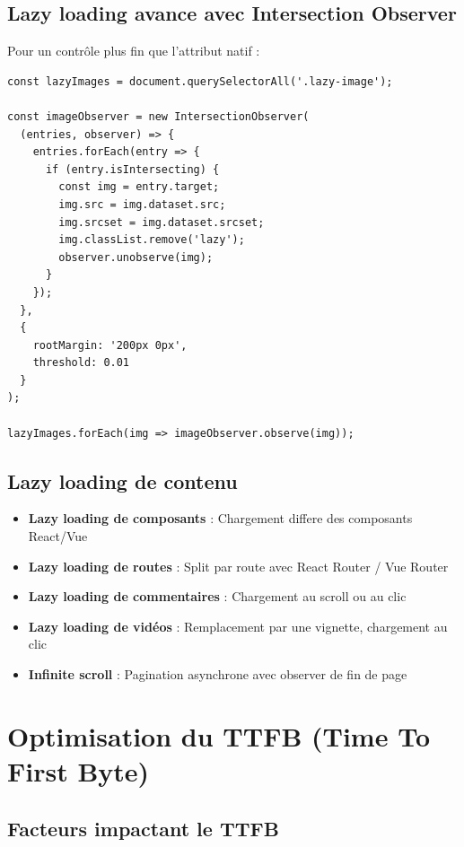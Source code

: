 \subsection{Lazy loading avance avec Intersection Observer}

Pour un contrôle plus fin que l'attribut natif :

\begin{lstlisting}[style=code,caption={Lazy loading avec Intersection Observer}]
const lazyImages = document.querySelectorAll('.lazy-image');

const imageObserver = new IntersectionObserver(
  (entries, observer) => {
    entries.forEach(entry => {
      if (entry.isIntersecting) {
        const img = entry.target;
        img.src = img.dataset.src;
        img.srcset = img.dataset.srcset;
        img.classList.remove('lazy');
        observer.unobserve(img);
      }
    });
  },
  {
    rootMargin: '200px 0px',
    threshold: 0.01
  }
);

lazyImages.forEach(img => imageObserver.observe(img));
\end{lstlisting}

\subsection{Lazy loading de contenu}

\begin{itemize}
    \item \textbf{Lazy loading de composants} : Chargement differe des composants React/Vue
    \item \textbf{Lazy loading de routes} : Split par route avec React Router / Vue Router
    \item \textbf{Lazy loading de commentaires} : Chargement au scroll ou au clic
    \item \textbf{Lazy loading de vidéos} : Remplacement par une vignette, chargement au clic
    \item \textbf{Infinite scroll} : Pagination asynchrone avec observer de fin de page
\end{itemize}

\section{Optimisation du TTFB (Time To First Byte)}

\subsection{Facteurs impactant le TTFB}

